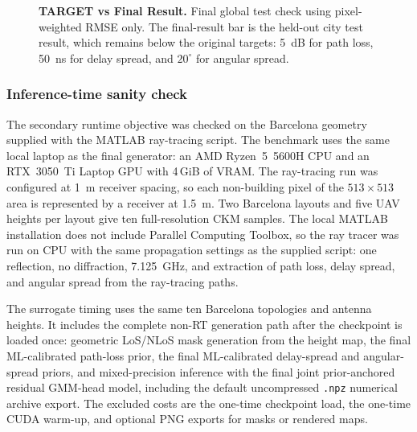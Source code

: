 \begin{figure}[H]
\begin{minipage}{0.31\textwidth}
\end{minipage}
\caption[Final result against original numerical targets.]%
{\textbf{TARGET vs Final Result.} Final global test check using
pixel-weighted RMSE only. The final-result bar is the held-out city test result,
which remains below the original targets: \SI{5}{dB} for path loss, \SI{50}{ns}
for delay spread, and \(20^\circ\) for angular spread.}
\label{fig:try80_test_objectives}
\end{figure}

\subsubsection*{Inference-time sanity check}

The secondary runtime objective was checked on the Barcelona geometry supplied
with the MATLAB ray-tracing script. The benchmark uses the same local laptop as
the final generator: an AMD Ryzen~5~5600H CPU and an RTX~3050~Ti Laptop GPU
with 4\,GiB of VRAM. The ray-tracing run was configured at
\SI{1}{m} receiver spacing, so each non-building pixel of the \(513\times513\)
area is represented by a receiver at \SI{1.5}{m}. Two Barcelona layouts and five
UAV heights per layout give ten full-resolution CKM samples. The local MATLAB
installation does not include Parallel Computing Toolbox, so the ray tracer was
run on CPU with the same propagation settings as the supplied script:
one reflection, no diffraction, \SI{7.125}{GHz}, and extraction of path loss,
delay spread, and angular spread from the ray-tracing paths.

The surrogate timing uses the same ten Barcelona topologies and antenna
heights. It includes the complete non-RT generation path after the checkpoint is
loaded once: geometric LoS/NLoS mask generation from the height map, the final
ML-calibrated path-loss prior, the final ML-calibrated delay-spread and
angular-spread priors, and mixed-precision inference with the final joint
prior-anchored residual GMM-head model, including the default uncompressed
\texttt{.npz} numerical archive export. The excluded costs are the one-time
checkpoint load, the one-time CUDA warm-up, and optional PNG exports for masks
or rendered maps.

